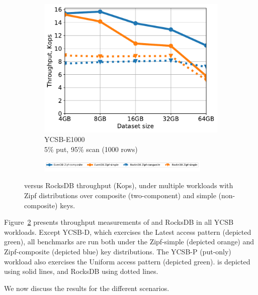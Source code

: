 \begin{figure}[tb]
\begin{subfigure}{0.33\linewidth}
\includegraphics[width=\textwidth]{figs/Workload_E+_line.pdf}
\caption{YCSB-E1000 \\5\% put, 95\% scan (1000 rows)}
\label{fig:throughput:e1000}
\end{subfigure}
\begin{subfigure}{\linewidth}
\centerline{
\includegraphics[width=0.9\textwidth]{figs/legend.pdf}
\vspace{-5mm}
}
\end{subfigure}
\caption{
{\sys\/ versus RocksDB throughput (Kops), under multiple workloads with Zipf distributions over composite (two-component) and
simple (non-composite) keys.}
}
\label{fig:throughput}
\end{figure}

Figure~\ref{fig:throughput} presents throughput measurements of \sys\/ and RocksDB
in all YCSB workloads. Except YCSB-D, which exercises the Latest access pattern
(depicted green), all benchmarks are run both under the Zipf-simple (depicted orange) 
and Zipf-composite (depicted blue) key distributions. The YCSB-P (put-only) workload 
also exercises the Uniform access pattern (depicted green). \sys\/ is depicted using solid
lines, and RocksDB using dotted lines. 

We now discuss the results for the different scenarios.

  
